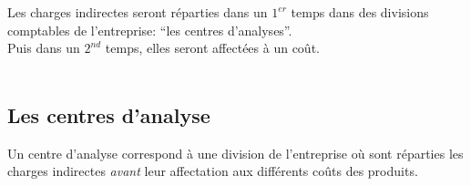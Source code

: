 \documentclass[12pt,a4paper,openany]{report}
\begin{document}
	 Les charges indirectes seront réparties dans un $1^{er}$ temps dans des divisions comptables de l'entreprise: ``les centres d'analyses''.\\
	 Puis dans un $2^{nd}$ temps, elles seront affectées à un coût.\\ \\
	 \subsection{Les centres d'analyse}
	 Un centre d'analyse correspond à une division de l'entreprise où sont réparties les charges indirectes \textit{avant} leur affectation
	 aux différents coûts des produits.
\end{document}
